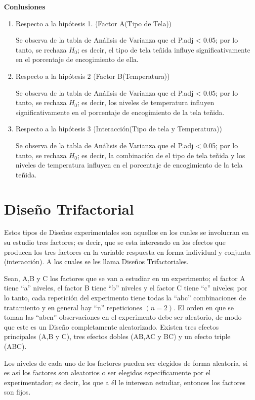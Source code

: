 \documentclass[12pt,letterpaper]{report}
\begin{document}
\textbf{Conlusiones}

\begin{enumerate}

\item {Respecto a la hipótesis 1. (Factor A(Tipo de Tela))}

Se observa de la tabla de Análisis de Varianza que el P.adj < 0.05; por lo tanto,
se rechaza $H_0$; es decir, el tipo de tela teñida influye significativamente en el porcentaje de encogimiento de ella.

\item {Respecto a la hipótesis 2 (Factor B(Temperatura))}

Se observa de la tabla de Análisis de Varianza que el P.adj < 0.05; por lo tanto, se
rechaza $H_0$; es decir, los niveles de temperatura influyen significativamente en el porcentaje de encogimiento de la tela teñida.

\item {Respecto a la hipótesis 3 (Interacción(Tipo de tela y Temperatura))}

Se observa de la tabla de Análisis de Varianza que el P.adj < 0.05; por lo tanto, se
rechaza $H_0$; es decir, la combinación de el tipo de tela teñida y los niveles de temperatura
influyen en el porcentaje de encogimiento de la tela teñida.
\end{enumerate}

\section*{Diseño Trifactorial}
Estos tipos de Diseños experimentales son aquellos en los cuales se involucran en su
estudio tres factores; es decir, que se esta interesado en los efectos que producen los tres
factores en la variable respuesta en forma individual y conjunta (interacción). A los cuales se
les llama Diseños Trifactoriales.

Sean, A,B y C los factores que se van a estudiar en un experimento; el factor A tiene
“a” niveles, el factor B tiene “b” niveles y el factor C tiene “c” niveles; por lo tanto, cada
repetición del experimento tiene todas la “abc” combinaciones de tratamiento y en general hay
“n” repeticiones $(n = 2)$. El orden en que se toman las “abcn” observaciones en el experimento
debe ser aleatorio, de modo que este es un Diseño completamente aleatorizado.
Existen tres efectos principales (A,B y C), tres efectos dobles (AB,AC y BC) y un efecto
triple (ABC).

Los niveles de cada uno de los factores pueden ser elegidos de forma aleatoria, si es así
los factores son aleatorios o ser elegidos específicamente por el experimentador; es decir, los
que a él le interesan estudiar, entonces los factores son fijos.
\end{document}
